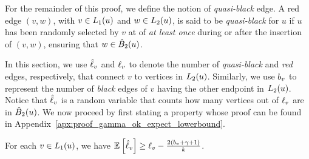 
For the remainder of this proof, we define the notion of \emph{quasi-black} edge. A red edge $(v,w)$, with $v \in L_1(u)$ and $w \in L_2(u)$, is said to be \textit{quasi-black} for $u$ if $u$ has been randomly selected by $v$ at  of  \emph{at least once} during or after the insertion of $(v,w)$, ensuring that $w \in \hat{B}_2(u)$.

In this section, we use $\hat{\ell}_v$ and $\ell_v$ to denote the number of \emph{quasi-black} and \emph{red} edges, respectively, that connect $v$ to vertices in $L_2(u)$. Similarly, we use $b_v$ to represent the number of \emph{black} edges of $v$ having the other endpoint in $L_2(u)$. Notice that $\hat{\ell}_v$ is a random variable that counts how many vertices out of $\ell_v$ are in $\hat{B}_2(u)$. We now proceed by first stating a property whose proof can be found in Appendix~\ref{apx:proof_gamma_ok_expect_lowerbound}.

\begin{lemma}\label{le:gamma_ok_expect_lowerbound}
     For each $v \in L_1(u)$, we have $\mathbb{E}_{} \left[ \hat{\ell}_v \right] \geq \ell_v - \frac{2(b_v + \gamma + 1)}{k}$.
\end{lemma}

